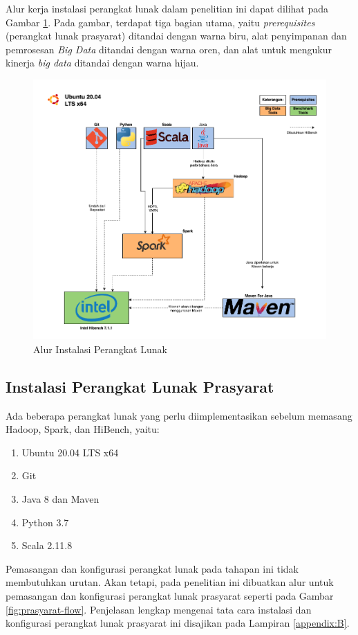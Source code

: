 Alur kerja instalasi perangkat lunak dalam penelitian ini dapat dilihat pada Gambar \ref{fig:alurkerja-soft}. Pada gambar, terdapat tiga bagian utama, yaitu \textit{prerequisites} (perangkat lunak prasyarat) ditandai dengan warna biru, alat penyimpanan dan pemrosesan \textit{Big Data} ditandai dengan warna oren, dan alat untuk mengukur kinerja \textit{big data} ditandai dengan warna hijau. 

\begin{landscape}
\begin{figure}[h]
    \centering
    \includegraphics[height=0.65\linewidth]{figures/ch03/alurkerja-soft.png}
    \caption{Alur Instalasi Perangkat Lunak}
    \label{fig:alurkerja-soft}
\end{figure}
\end{landscape}

\subsection{Instalasi Perangkat Lunak Prasyarat}
Ada beberapa perangkat lunak yang perlu diimplementasikan sebelum memasang Hadoop, Spark, dan HiBench, yaitu:
\begin{enumerate}
	\item Ubuntu 20.04 LTS x64
	\item Git
	\item Java 8 dan Maven
	\item Python 3.7
	\item Scala 2.11.8
\end{enumerate}

Pemasangan dan konfigurasi perangkat lunak pada tahapan ini tidak membutuhkan urutan. Akan tetapi, pada penelitian ini dibuatkan alur untuk pemasangan dan konfigurasi perangkat lunak prasyarat seperti pada Gambar \ref{fig:prasyarat-flow}. Penjelasan lengkap mengenai tata cara instalasi dan konfigurasi perangkat lunak prasyarat ini disajikan pada Lampiran \ref{appendix:B}. 

